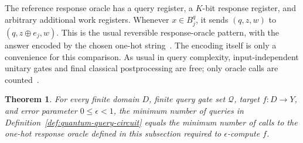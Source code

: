\documentclass[11pt]{article}
\numberwithin{equation}{section}
\newtheorem{theorem}[definition]{Theorem}
\theoremstyle{remark}
\begin{document}
The reference response oracle has a query register, a $K$-bit response register, and arbitrary additional work registers. Whenever $x\in B_j^q$, it sends $(q,z,w)$ to $(q,z\oplus e_j,w)$. This is the usual reversible response-oracle pattern, with the answer encoded by the chosen one-hot string~\cite{BealsBuhrmanCleveMoscaDeWolf2001}. The encoding itself is only a convenience for this comparison. As usual in query complexity, input-independent unitary gates and final classical postprocessing are free; only oracle calls are counted~\cite{BealsBuhrmanCleveMoscaDeWolf2001}.

\begin{theorem}
\label{thm:standard-quantum-equivalence}
For every finite domain $D$, finite query gate set $\mathcal Q$, target $f:D\to Y$, and error parameter $0\leq\epsilon<1$, the minimum number of queries in Definition~\ref{def:quantum-query-circuit} equals the minimum number of calls to the one-hot response oracle defined in this subsection required to $\epsilon$-compute $f$.
\end{theorem}
\end{document}
